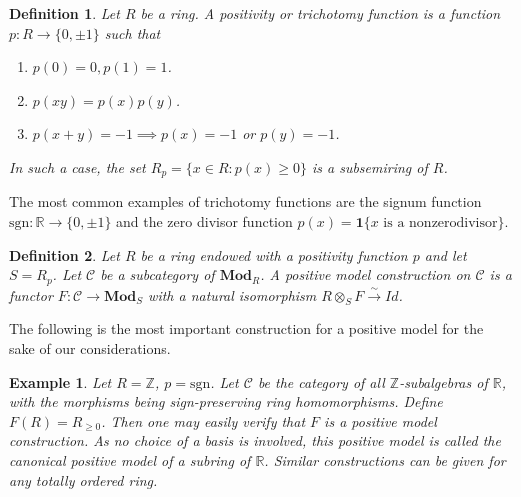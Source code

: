 \documentclass[notitlepage, 10pt]{article}
\theoremstyle{defin}
\newtheorem{defn}{Definition}
\newtheorem{eg}{Example}[section]
\theoremstyle{theo}
\theoremstyle{rema}
\newcommand{\R}{\mathbb{R}}
\newcommand{\Z}{\mathbb{Z}}
\newcommand{\cC}{\mathcal{C}}
\begin{document}
\begin{defn}\label{d:positivity function}
    Let $R$ be a ring. A \textit{positivity} or \textit{trichotomy function} is a function $p: R\to \{0, \pm 1\}$ such that
    \begin{enumerate}
        \item $p(0)=0, p(1)=1$.
        \item $p(xy)=p(x)p(y)$.
        \item $p(x+y)=-1\implies p(x)=-1$ or $p(y)=-1$.
    \end{enumerate}

    In such a case, the set $R_p = \{x\in R : p(x)\geq 0\}$ is a subsemiring of $R$.
\end{defn}

The most common examples of trichotomy functions are the signum function $\text{sgn}:\R \to \{0,\pm 1\}$ and the zero divisor function $p(x) = \mathbf{1}\{x \text{ is a nonzerodivisor}\}.$ 

\begin{defn}\label{d:positive model}
    Let $R$ be a ring endowed with a positivity function $p$ and let $S=R_p$. Let $\cC$ be a subcategory of $\mathbf{Mod}_R$. A \textit{positive model construction} on $\cC$ is a functor $F : \cC \to \mathbf{Mod}_S$ with a natural isomorphism $ R \otimes_{S} F \xrightarrow{\sim} Id$.
\end{defn}

The following is the most important construction for a positive model for the sake of our considerations.

\begin{eg}
    Let $R=\Z$, $p=\text{sgn}$. Let $\cC$ be the category of all $\Z$-subalgebras of $\R$, with the morphisms being sign-preserving ring homomorphisms. Define $F(R)=R_{\geq 0}$. Then one may easily verify that $F$ is a positive model construction. As no choice of a basis is involved, this positive model is called the \textit{canonical positive model} of a subring of $\R$. Similar constructions can be given for any totally ordered ring. 
\end{eg}
\end{document}
